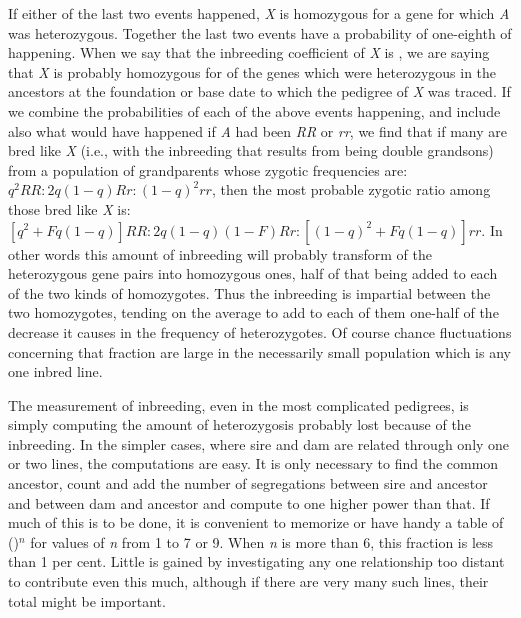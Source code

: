 \noindent
If either of the last two events happened, \textit{X} is homozygous for a gene
for which \textit{A} was heterozygous. Together the last two events have a
probability of one-eighth of happening. When we say that the inbreeding
coefficient of \textit{X} is , we are saying that \textit{X} is probably homozygous
for  of the genes which were heterozygous in the ancestors at the
foundation or base date to which the pedigree of \textit{X} was traced. If we
combine the probabilities of each of the above events happening, and
include also what would have happened if \textit{A} had been \textit{RR} or \textit{rr}, we
find that if many are bred like \textit{X} (i.e., with the inbreeding
that results from being double grandsons) from a population of grandparents
whose zygotic frequencies are: $q^{2}RR : 2q(1 - q)Rr : (1-q)^{2}rr$,
then the most probable zygotic ratio among those bred like \textit{X} is:
$[q^2 + Fq(1 - q)]RR : 2q(1 - q)(1 - F)Rr: [(1 - q)^{2}+Fq(1 - q)]rr$.
In other words this amount of inbreeding will probably transform 
of the heterozygous gene pairs into homozygous ones, half of that 
being added to each of the two kinds of homozygotes. Thus the inbreeding
is impartial between the two homozygotes, tending on the average
to add to each of them one-half of the decrease it causes in the frequency
of heterozygotes. Of course chance fluctuations concerning that fraction
are large in the necessarily small population which is any one
inbred line.

The measurement of inbreeding, even in the most complicated pedigrees,
is simply computing the amount of heterozygosis probably lost
because of the inbreeding. In the simpler cases, where sire and dam are
related through only one or two lines, the computations are easy. It is
only necessary to find the common ancestor, count and add the number
of segregations between sire and ancestor and between dam and ancestor
and compute  to one higher power than that. If much of this is to
be done, it is convenient to memorize or have handy a table of ()$^n$ for
values of \textit{n} from 1 to 7 or 9. When \textit{n} is more than 6, this fraction is less
than 1 per cent. Little is gained by investigating any one relationship
too distant to contribute even this much, although if there are very
many such lines, their total might be important.


